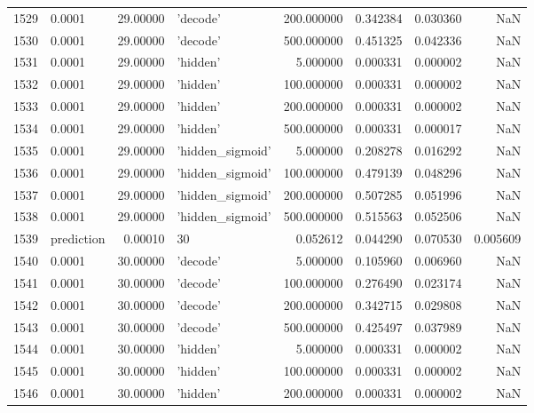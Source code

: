 \documentclass[10pt,a4paper]{article}
\begin{document}
\begin{tabular}{llrlrrrr}
1529 &      0.0001 &  29.00000 &           'decode' &  200.000000 &  0.342384 &  0.030360 &       NaN \\
1530 &      0.0001 &  29.00000 &           'decode' &  500.000000 &  0.451325 &  0.042336 &       NaN \\
1531 &      0.0001 &  29.00000 &           'hidden' &    5.000000 &  0.000331 &  0.000002 &       NaN \\
1532 &      0.0001 &  29.00000 &           'hidden' &  100.000000 &  0.000331 &  0.000002 &       NaN \\
1533 &      0.0001 &  29.00000 &           'hidden' &  200.000000 &  0.000331 &  0.000002 &       NaN \\
1534 &      0.0001 &  29.00000 &           'hidden' &  500.000000 &  0.000331 &  0.000017 &       NaN \\
1535 &      0.0001 &  29.00000 &   'hidden\_sigmoid' &    5.000000 &  0.208278 &  0.016292 &       NaN \\
1536 &      0.0001 &  29.00000 &   'hidden\_sigmoid' &  100.000000 &  0.479139 &  0.048296 &       NaN \\
1537 &      0.0001 &  29.00000 &   'hidden\_sigmoid' &  200.000000 &  0.507285 &  0.051996 &       NaN \\
1538 &      0.0001 &  29.00000 &   'hidden\_sigmoid' &  500.000000 &  0.515563 &  0.052506 &       NaN \\
1539 &  prediction &   0.00010 &                 30 &    0.052612 &  0.044290 &  0.070530 &  0.005609 \\
1540 &      0.0001 &  30.00000 &           'decode' &    5.000000 &  0.105960 &  0.006960 &       NaN \\
1541 &      0.0001 &  30.00000 &           'decode' &  100.000000 &  0.276490 &  0.023174 &       NaN \\
1542 &      0.0001 &  30.00000 &           'decode' &  200.000000 &  0.342715 &  0.029808 &       NaN \\
1543 &      0.0001 &  30.00000 &           'decode' &  500.000000 &  0.425497 &  0.037989 &       NaN \\
1544 &      0.0001 &  30.00000 &           'hidden' &    5.000000 &  0.000331 &  0.000002 &       NaN \\
1545 &      0.0001 &  30.00000 &           'hidden' &  100.000000 &  0.000331 &  0.000002 &       NaN \\
1546 &      0.0001 &  30.00000 &           'hidden' &  200.000000 &  0.000331 &  0.000002 &       NaN \\

\end{tabular}
\end{document}
